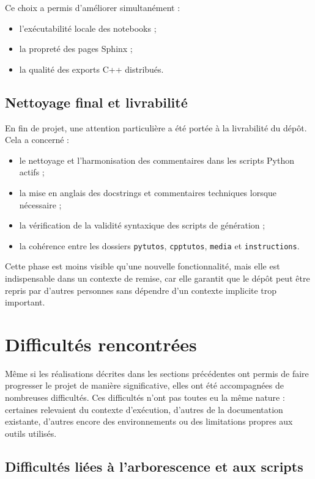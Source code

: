 \documentclass[a4paper,12pt,twoside]{article}
\begin{document}
Ce choix a permis d'améliorer simultanément :
\begin{itemize}
    \item l'exécutabilité locale des notebooks ;
    \item la propreté des pages Sphinx ;
    \item la qualité des exports C++ distribués.
\end{itemize}

\subsection{Nettoyage final et livrabilité}

En fin de projet, une attention particulière a été portée à la livrabilité du dépôt. Cela a concerné :
\begin{itemize}
    \item le nettoyage et l'harmonisation des commentaires dans les scripts Python actifs ;
    \item la mise en anglais des docstrings et commentaires techniques lorsque nécessaire ;
    \item la vérification de la validité syntaxique des scripts de génération ;
    \item la cohérence entre les dossiers \texttt{pytutos}, \texttt{cpptutos}, \texttt{media} et \texttt{instructions}.
\end{itemize}

Cette phase est moins visible qu'une nouvelle fonctionnalité, mais elle est indispensable dans un contexte de remise, car elle garantit que le dépôt peut être repris par d'autres personnes sans dépendre d'un contexte implicite trop important.

\FloatBarrier

\section{Difficultés rencontrées}

Même si les réalisations décrites dans les sections précédentes ont permis de faire progresser le projet de manière significative, elles ont été accompagnées de nombreuses difficultés. Ces difficultés n'ont pas toutes eu la même nature : certaines relevaient du contexte d'exécution, d'autres de la documentation existante, d'autres encore des environnements ou des limitations propres aux outils utilisés.

\subsection{Difficultés liées à l'arborescence et aux scripts}
\end{document}
